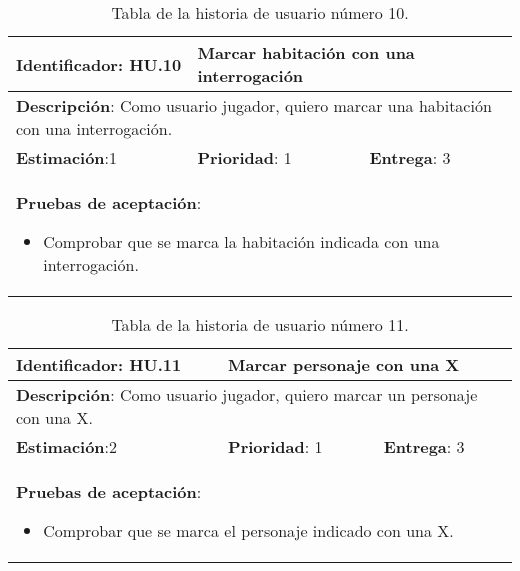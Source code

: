 \begin{table}[h]
  \begin{center}
    \begin{tabular}{|p{4cm}|p{4cm}|p{4cm}|}

    \hline
    \textbf{Identificador}: HU.10
    & \multicolumn{2}{p{8cm}|}{Marcar habitación con una interrogación}\\

    \hline
    \multicolumn{3}{|p{12cm}|}{\textbf{Descripción}: Como usuario jugador, quiero marcar una habitación con una interrogación.}\\

    \hline
    \textbf{Estimación}:1
    & \textbf{Prioridad}: 1
    & \textbf{Entrega}: 3\\

    \hline
    \multicolumn{3}{|p{12cm}|}{\textbf{Pruebas de aceptación}:
      \begin{itemize}
        \item Comprobar que se marca la habitación indicada con una interrogación.
      \end{itemize}
    }\\

    \hline

    \end{tabular}

    \caption{Tabla de la historia de usuario número 10.}
    \label{tabla-hu10}

  \end{center}
\end{table}

\begin{table}[h]
  \begin{center}
    \begin{tabular}{|p{4cm}|p{4cm}|p{4cm}|}

    \hline
    \textbf{Identificador}: HU.11
    & \multicolumn{2}{p{8cm}|}{Marcar personaje con una X}\\

    \hline
    \multicolumn{3}{|p{12cm}|}{\textbf{Descripción}: Como usuario jugador, quiero marcar un personaje con una X.}\\

    \hline
    \textbf{Estimación}:2
    & \textbf{Prioridad}: 1
    & \textbf{Entrega}: 3\\

    \hline
    \multicolumn{3}{|p{12cm}|}{\textbf{Pruebas de aceptación}:
      \begin{itemize}
        \item Comprobar que se marca el personaje indicado con una X.
      \end{itemize}
    }\\

    \hline

    \end{tabular}

    \caption{Tabla de la historia de usuario número 11.}
    \label{tabla-hu11}

  \end{center}
\end{table}

